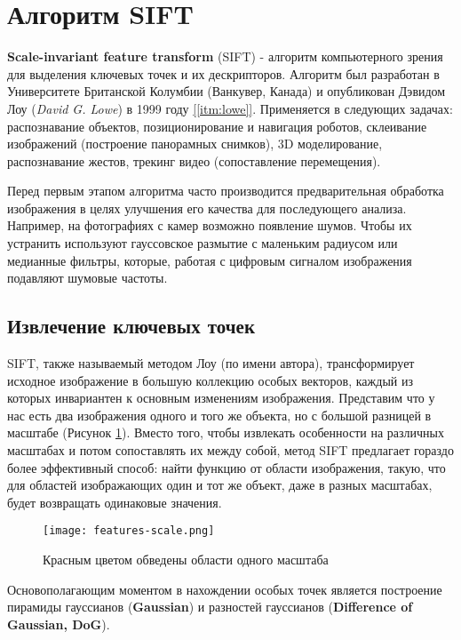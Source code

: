 \section{Алгоритм SIFT}

\textbf{Scale-invariant feature transform} (SIFT) - алгоритм компьютерного зрения для выделения ключевых точек и их дескрипторов. Алгоритм был разработан в Университете Британской Колумбии (Ванкувер, Канада) и опубликован Дэвидом Лоу (\textit{David G. Lowe}) в 1999 году \hyperref[itm:lowe]{[\ref{itm:lowe}]}. Применяется в следующих задачах: распознавание объектов, позиционирование и навигация роботов, склеивание изображений (построение панорамных снимков), 3D моделирование, распознавание жестов, трекинг видео (сопоставление перемещения).

Перед первым этапом алгоритма часто производится предварительная обработка изображения в целях улучшения его качества для последующего анализа. Например, на фотографиях с камер возможно появление шумов. Чтобы их устранить используют гауссовское размытие с маленьким радиусом или медианные фильтры, которые, работая с цифровым сигналом изображения подавляют шумовые частоты.

\subsection{Извлечение ключевых точек}

SIFT, также называемый методом Лоу (по имени автора), трансформирует исходное изображение в большую коллекцию особых векторов, каждый из которых инвариантен к основным изменениям изображения. Представим что у нас есть два изображения одного и того же объекта, но с большой разницей в масштабе (Рисунок \ref{fig:scale}). Вместо того, чтобы извлекать особенности на различных масштабах и потом сопоставлять их между собой, метод SIFT предлагает гораздо более эффективный способ: найти функцию от области изображения, такую, что для областей изображающих один и тот же объект, даже в разных масштабах, будет возвращать одинаковые значения.

\begin{figure}[h]
    \centering
    \texttt{[image: features-scale.png]}
    \caption{Красным цветом обведены области одного масштаба}
    \label{fig:scale}
\end{figure}


Основополагающим моментом в нахождении особых точек является построение пирамиды гауссианов (\textbf{Gaussian}) и разностей гауссианов (\textbf{Difference of Gaussian, DoG}).

